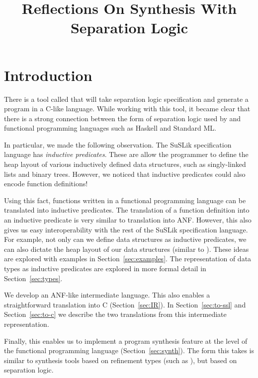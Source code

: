 \documentclass[runningheads]{llncs}
\begin{document}
\title{Reflections On Synthesis With Separation Logic}
\maketitle

\section{Introduction}
\label{sec:introduction}

There is a tool called \SuSLik{} that will take separation logic specification and generate
a program in a C-like language. While working with this tool, it became clear that there is a strong
connection between the form of separation logic used by \SuSLik{} and functional programming languages such as Haskell and Standard ML.

In particular, we made the following observation. The SuSLik specification language has \textit{inductive predicates}. These are
allow the programmer to define the heap layout of various inductively defined data structures, such as singly-linked lists and binary trees.
However, we noticed that inductive predicates could also encode function definitions!

Using this fact, functions written in a functional programming language can be translated into inductive predicates. The translation
of a function definition into an inductive predicate is very similar to translation into ANF. However, this also gives us easy
interoperability with the rest of the SuSLik specification language. For example, not only can we define data structures as inductive
predicates, we can also dictate the heap layout of our data structures (similar to \Dargent\cite{Dargent}). These ideas are explored
with examples in Section~\ref{sec:examples}. The representation of data types as inductive predicates are explored in more formal detail
in Section~\ref{sec:types}.

We develop an ANF-like intermediate language. This also enables a straightforward translation into C (Section~\ref{sec:IR}).
In Section~\ref{sec:to-ssl} and Section~\ref{sec:to-c} we describe the two translations from this intermediate representation.

Finally, this enables us to implement a program synthesis feature at the level of the functional programming language (Section~\ref{sec:synth}).
The form this takes is similar to synthesis tools based on refinement types (such as \Synquid), but based on separation logic.
\end{document}
